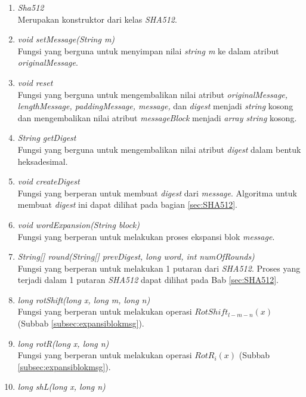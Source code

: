\begin{enumerate}
	\item \textit{Sha512} \\
	Merupakan konstruktor dari kelas \textit{SHA512}.
	\item \textit{void setMessage(String m)} \\
	Fungsi yang berguna untuk menyimpan nilai \textit{string m} ke dalam atribut \textit{originalMessage}.
	\item \textit{void reset} \\
	Fungsi yang berguna untuk mengembalikan nilai atribut \textit{originalMessage, lengthMessage, paddingMessage, message,} dan \textit{digest} menjadi \textit{string} kosong dan mengembalikan nilai atribut \textit{messageBlock} menjadi \textit{array string} kosong.
	\item \textit{String getDigest} \\
	Fungsi yang berguna untuk mengembalikan nilai atribut \textit{digest} dalam bentuk heksadesimal.
	\item \textit{void createDigest} \\
	Fungsi yang berperan untuk membuat \textit{digest} dari \textit{message}. Algoritma untuk membuat \textit{digest} ini dapat dilihat pada bagian \ref{sec:SHA512}.
	\item \textit{void wordExpansion(String block)} \\
	Fungsi yang berperan untuk melakukan proses ekspansi blok \textit{message}.
	\item \textit{String[] round(String[] prevDigest, long word, int numOfRounds)} \\
	Fungsi yang berperan untuk melakukan 1 putaran dari \textit{SHA512}. Proses yang terjadi dalam 1 putaran \textit{SHA512} dapat dilihat pada Bab \ref{sec:SHA512}.
	\item \textit{long rotShift(long x, long m, long n)} \\
	Fungsi yang berperan untuk melakukan operasi \begin{math}RotShift_{l-m-n}(x)\end{math} (Subbab \ref{subsec:expansiblokmsg}).
	\item \textit{long rotR(long x, long n)} \\
	Fungsi yang berperan untuk melakukan operasi \begin{math}RotR_i(x)\end{math} (Subbab \ref{subsec:expansiblokmsg}).
	\item \textit{long shL(long x, long n)} \\

\end{enumerate}

